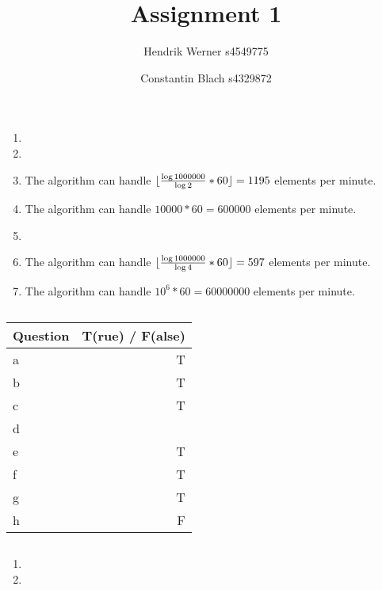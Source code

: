 \documentclass[12pt]{article}
\title {Assignment 1}
\author {
	Hendrik Werner s4549775
	\and Constantin Blach s4329872
}
\DeclarePairedDelimiter\floor{\lfloor}{\rfloor}
\begin{document}
\maketitle

\section{} %
\subsection{} %
\begin{enumerate}[a]
	\item %
	\item %
	\item %
	The algorithm can handle $\floor{\frac{\log{1000000}}{\log{2}} * 60} = 1195$ elements per minute.

	\item %
	The algorithm can handle $10000 * 60 = 600000$ elements per minute.

	\item %
	\item %
	The algorithm can handle $\floor{\frac{\log{1000000}}{\log{4}} * 60} = 597$ elements per minute.

	\item %
	The algorithm can handle $10^6 * 60 = 60000000$ elements per minute.
\end{enumerate}

\subsection{} %
\begin{tabular}{|l|r|}
	\hline
	Question & T(rue) / F(alse) \\
	\hline
	a & T\\
	b & T\\
	c & T\\
	d & \\
	e & T\\
	f & T\\
	g & T\\
	h & F\\
	\hline
\end{tabular}

\subsection{} %
\begin{enumerate}[a]
	\item %
	\item %
\end{enumerate}
\end{document}
